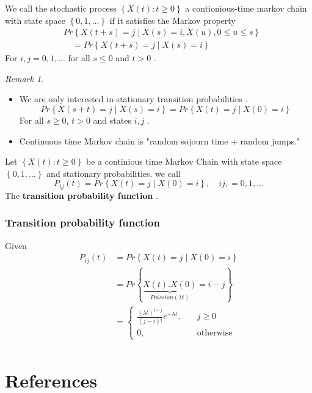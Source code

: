 \documentclass{article}
\theoremstyle{remark}
\newtheorem*{remark}{Remark}
\begin{document}
We call the stochastic process $\left\{ X\left( t \right): t\ge 0 \right\}$ a contionious-time markov chain with state space $\left\{ 0,1, \ldots \right\}$ if it satisfies the Markov property \[
  \begin{split}
&Pr \left \{   X\left( t+s \right) = j  \mid  X\left( s \right) = i, X\left( u \right),   0\le u \le s \right \}   \\
 & \quad   = Pr \left \{   X\left( t+s \right) = j  \mid  X\left( s \right) = i\right \}
  \end{split}
\]
For $i,j = 0,1,\ldots$ for all $s \le 0$ and $t > 0$ .

\newpage
\begin{remark}
  \begin{itemize}
    \item We are only interested in stationary transition probabilities . \[
    Pr \left \{  X\left( s + t \right) = j  \mid  X\left( s \right) = i \right \}  = Pr \left \{ X\left( t \right) = j  \mid  X\left( 0 \right) = i  \right \}
    \]
    For all $ s \ge 0$, $t> 0$ and states $i,j$ .
  \item Continuous time Markov chain is "random sojourn time + random jumps."
  \end{itemize}
\end{remark}


\begin{definition}
  Let $\left\{ X\left( t \right) : t\ge 0 \right\}$ be a continious time Markov Chain with state space $\left\{ 0,1, \ldots \right\}$ and stationary probabilities. we call \[
  P_{ij} \left( t \right) = Pr \left \{ X\left( t \right) = j  \mid  X\left( 0 \right) = i  \right \}  , \quad  ij, = 0,1, \ldots
  \]
  The \textbf{transition probability function} .
\end{definition}


\subsubsection{Transition probability function}%
\label{ssub:transition_probability_function}

Given \[
  \begin{split}
P_{ij}\left( t \right)  & = Pr \left \{  X\left( t \right) = j  \mid  X\left( 0 \right) = i \right \}  \\
 &=  Pr \left \{  \underbrace{X\left( t \right) . X\left( 0 \right)}_{Poission\left( \lambda t \right)}  = i - j \right \}  \\
 &=  \begin{cases}
    \frac{\left( \lambda t \right)^{i-j}}{\left( j-i \right)!}  e^{-\lambda t}, &
     \quad j \ge 0 \\
    0 , &  \quad \text{otherwise}
 \end{cases} \\
  \end{split}
\]


\section{References}
\label{sec:references}




\end{document}
